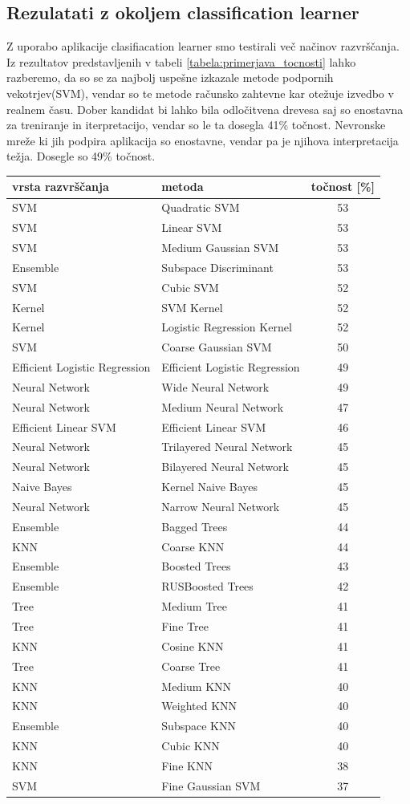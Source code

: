 \subsection{Rezulatati z okoljem classification learner}
Z uporabo aplikacije clasifiacation learner smo testirali več načinov razvrščanja. Iz rezultatov predstavljenih v tabeli \ref{tabela:primerjava_tocnosti} lahko razberemo, da so se za najbolj uspešne izkazale metode podpornih vekotrjev(SVM), vendar so te metode računsko zahtevne kar otežuje izvedbo v realnem času. Dober kandidat bi lahko bila odločitvena drevesa saj so enostavna za treniranje in iterpretacijo, vendar so le ta dosegla 41\% točnost. Nevronske mreže ki jih podpira aplikacija so enostavne, vendar pa je njihova interpretacija težja. Dosegle so 49\% točnost.
\begin{table}
\centering
\begin{tabular}{|l|l|c|}
\hline
vrsta razvrščanja & metoda & točnost [\%] \\
\hline SVM&Quadratic SVM&53\\
\hline SVM&Linear SVM&53\\
\hline SVM&Medium Gaussian SVM&53\\
\hline Ensemble&Subspace Discriminant&53\\
\hline SVM&Cubic SVM&52\\
\hline Kernel&SVM Kernel&52\\
\hline Kernel&Logistic Regression Kernel&52\\
\hline SVM&Coarse Gaussian SVM&50\\
\hline Efficient Logistic Regression&Efficient Logistic Regression&49\\
\hline Neural Network&Wide Neural Network&49\\
\hline Neural Network&Medium Neural Network&47\\
\hline Efficient Linear SVM&Efficient Linear SVM&46\\
\hline Neural Network&Trilayered Neural Network&45\\
\hline Neural Network&Bilayered Neural Network&45\\
\hline Naive Bayes&Kernel Naive Bayes&45\\
\hline Neural Network&Narrow Neural Network&45\\
\hline Ensemble&Bagged Trees&44\\
\hline KNN&Coarse KNN&44\\
\hline Ensemble&Boosted Trees&43\\
\hline Ensemble&RUSBoosted Trees&42\\
\hline Tree&Medium Tree&41\\
\hline Tree&Fine Tree&41\\
\hline KNN&Cosine KNN&41\\
\hline Tree&Coarse Tree&41\\
\hline KNN&Medium KNN&40\\
\hline KNN&Weighted KNN&40\\
\hline Ensemble&Subspace KNN&40\\
\hline KNN&Cubic KNN&40\\
\hline KNN&Fine KNN&38\\
\hline SVM&Fine Gaussian SVM&37\\


\end{tabular}
\end{table}
